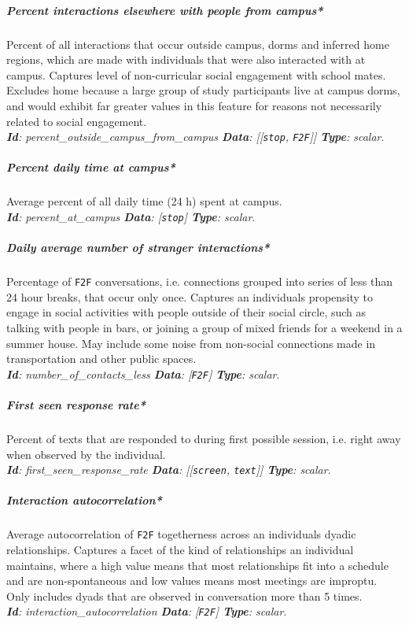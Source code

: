 \subparagraph*{Percent interactions elsewhere with people from campus*}
Percent of all interactions that occur outside campus, dorms and inferred home regions, which are made with individuals that were also interacted with at campus. Captures level of non-curricular social engagement with school mates. Excludes home because a large group of study participants live at campus dorms, and would exhibit far greater values in this feature for reasons not necessarily related to social engagement.\\ \textit{\textbf{Id}: percent\_outside\_campus\_from\_campus \textbf{Data}: [[\texttt{\footnotesize stop}, \texttt{\footnotesize F2F}]] \textbf{Type}: scalar}.

\subparagraph*{Percent daily time at campus*}
Average percent of all daily time (24 h) spent at campus.\\ \textit{\textbf{Id}: percent\_at\_campus \textbf{Data}: [\texttt{\footnotesize stop}] \textbf{Type}: scalar}.

\subparagraph*{Daily average number of stranger interactions*}
Percentage of \texttt{\small F2F} conversations, i.e. connections grouped into series of less than 24 hour breaks, that occur only once. Captures an individuals propensity to engage in social activities with people outside of their social circle, such as talking with people in bars, or joining a group of mixed friends for a weekend in a summer house. May include some noise from non-social connections made in transportation and other public spaces.\\ \textit{\textbf{Id}: number\_of\_contacts\_less \textbf{Data}: [\texttt{\footnotesize F2F}] \textbf{Type}: scalar}.

\subparagraph*{First seen response rate*}
Percent of texts that are responded to during first possible session, i.e. right away when observed by the individual.\\ \textit{\textbf{Id}: first\_seen\_response\_rate \textbf{Data}: [[\texttt{\footnotesize screen}, \texttt{\footnotesize text}]] \textbf{Type}: scalar}.

\subparagraph*{Interaction autocorrelation*}
Average autocorrelation of \texttt{\small F2F} togetherness across an individuals dyadic relationships. Captures a facet of the kind of relationships an individual maintains, where a high value means that most relationships fit into a schedule and are non-spontaneous and low values means most meetings are improptu. Only includes dyads that are observed in conversation more than 5 times.\\ \textit{\textbf{Id}: interaction\_autocorrelation \textbf{Data}: [\texttt{\footnotesize F2F}] \textbf{Type}: scalar}.